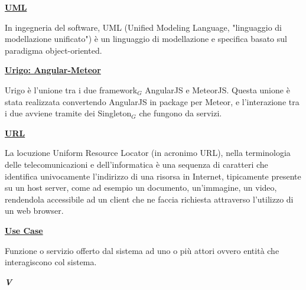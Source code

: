 \bigskip
\begin{addmargin}[0em]{0em}	
	\textbf{\underline{UML}}
\end{addmargin}

\medskip
\begin{addmargin}[5em]{1em}
In ingegneria del software, UML (Unified Modeling Language, "linguaggio di modellazione unificato") è un linguaggio di modellazione e specifica basato sul paradigma object-oriented.
\end{addmargin}	

\bigskip
\begin{addmargin}[0em]{0em}	
	\textbf{\underline{Urigo: Angular-Meteor}}
\end{addmargin}

\medskip
\begin{addmargin}[5em]{1em}
Urigo è l'unione tra i due framework$_G$ AngularJS e MeteorJS. Questa unione è stata realizzata convertendo AngularJS in package per Meteor, e l'interazione tra i due avviene tramite dei Singleton$_G$ che fungono da servizi.
\end{addmargin}

\bigskip
\begin{addmargin}[0em]{0em}	
	\textbf{\underline{URL}}
\end{addmargin}

\medskip
\begin{addmargin}[5em]{1em}
La locuzione Uniform Resource Locator (in acronimo URL), nella terminologia delle telecomunicazioni e dell'informatica è una sequenza di caratteri che identifica univocamente l'indirizzo di una risorsa in Internet, tipicamente presente su un host server, come ad esempio un documento, un'immagine, un video, rendendola accessibile ad un client che ne faccia richiesta attraverso l'utilizzo di un web browser.
\end{addmargin}
 
\bigskip
\begin{addmargin}[0em]{0em}
	\textbf{\underline{Use Case}} 
\end{addmargin}

\medskip
\begin{addmargin}[5em]{1em}
Funzione o servizio offerto dal sistema ad uno o più attori ovvero entità che interagiscono col sistema.
\end{addmargin}	

\newpage

\cleardoublepage
{}
{}
\noindent\hrulefill\hspace{4mm}\textbf{\textsl{\Huge{V}}}\hspace{4mm}\hrulefill
\vspace*{2\bigskipamount}

